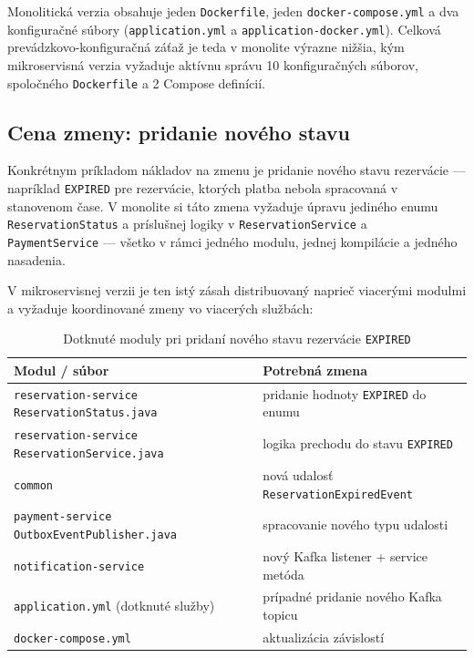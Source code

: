 Monolitická verzia obsahuje jeden \texttt{Dockerfile}, jeden \texttt{docker-compose.yml} a dva konfiguračné súbory (\texttt{application.yml} a \texttt{application-docker.yml}). Celková prevádzkovo-konfiguračná záťaž je teda v monolite výrazne nižšia, kým mikroservisná verzia vyžaduje aktívnu správu 10 konfiguračných súborov, spoločného \texttt{Dockerfile} a 2 Compose definícií.

\subsection*{Cena zmeny: pridanie nového stavu}

Konkrétnym príkladom nákladov na zmenu je pridanie nového stavu rezervácie — napríklad \texttt{EXPIRED} pre rezervácie, ktorých platba nebola spracovaná v stanovenom čase. V monolite si táto zmena vyžaduje úpravu jediného enumu \\ \texttt{ReservationStatus} a príslušnej logiky v \texttt{ReservationService} a \\ \texttt{PaymentService} — všetko v rámci jedného modulu, jednej kompilácie a jedného nasadenia.

V mikroservisnej verzii je ten istý zásah distribuovaný naprieč viacerými modulmi a vyžaduje koordinované zmeny vo viacerých službách:

\begin{table}[H]
\centering
\begin{tabular}{|p{}|p{}|}
\hline
\textbf{Modul / súbor} & \textbf{Potrebná zmena} \\ \hline
\texttt{reservation-service} \newline \texttt{ReservationStatus.java} & pridanie hodnoty \texttt{EXPIRED} do enumu \\ \hline
\texttt{reservation-service} \newline \texttt{ReservationService.java} & logika prechodu do stavu \texttt{EXPIRED} \\ \hline
\texttt{common} & nová udalosť \texttt{ReservationExpiredEvent} \\ \hline
\texttt{payment-service} \newline \texttt{OutboxEventPublisher.java} & spracovanie nového typu udalosti \\ \hline
\texttt{notification-service} & nový Kafka listener + service metóda \\ \hline
\texttt{application.yml} (dotknuté služby) & prípadné pridanie nového Kafka topicu \\ \hline
\texttt{docker-compose.yml} & aktualizácia závislostí \\ \hline
\end{tabular}
\caption{Dotknuté moduly pri pridaní nového stavu rezervácie \texttt{EXPIRED}}
\label{tab:cost-of-change}
\end{table}

